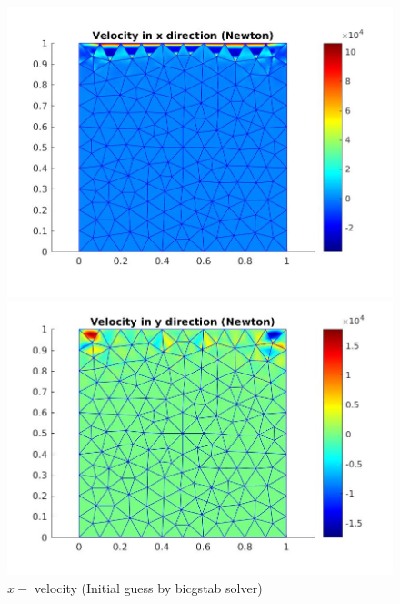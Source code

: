 \documentclass[a4paper]{book}
\begin{document}
\begin{figure}
  \begin{minipage}[c]{0.67\textwidth}
    \includegraphics[width=\textwidth]{lid_newton_vx_bicgstab.jpg}
  \end{minipage}\hfill
  \begin{minipage}[c]{0.3\textwidth}
    \caption{$x-$ velocity (Initial guess by bicgstab solver)}
  \label{x_vel_navier_stoke_bicgstab_lid}
  \end{minipage}
  \begin{minipage}[c]{0.67\textwidth}
    \includegraphics[width=\textwidth]{lid_newton_vy_bicgstab.jpg}
  \end{minipage}\hfill
  \begin{minipage}[c]{0.3\textwidth}

\end{minipage}
\end{figure}
\end{document}
